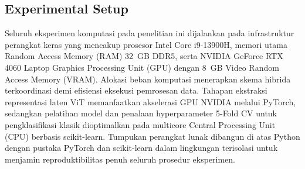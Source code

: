 \subsection{Experimental Setup}
\label{sec:experimental_setup}

Seluruh eksperimen komputasi pada penelitian ini dijalankan pada infrastruktur perangkat keras yang mencakup prosesor Intel Core i9-13900H, memori utama Random Access Memory (RAM) 32~GB DDR5, serta NVIDIA GeForce RTX 4060 Laptop Graphics Processing Unit (GPU) dengan 8~GB Video Random Access Memory (VRAM). Alokasi beban komputasi menerapkan skema hibrida terkoordinasi demi efisiensi eksekusi pemrosesan data. Tahapan ekstraksi representasi laten ViT memanfaatkan akselerasi GPU NVIDIA melalui PyTorch, sedangkan pelatihan model dan penalaan hyperparameter 5-Fold CV untuk pengklasifikasi klasik dioptimalkan pada multicore Central Processing Unit (CPU) berbasis scikit-learn. Tumpukan perangkat lunak dibangun di atas Python dengan pustaka PyTorch dan scikit-learn dalam lingkungan terisolasi untuk menjamin reproduktibilitas penuh seluruh prosedur eksperimen.
